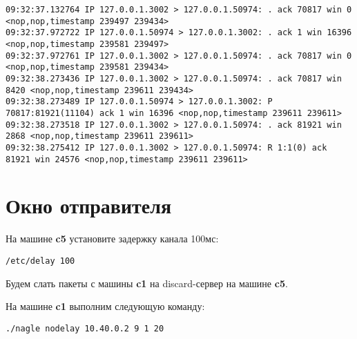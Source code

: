 \documentclass[a4paper,12pt]{article}
\begin{document}
\begin{Verbatim}
09:32:37.132764 IP 127.0.0.1.3002 > 127.0.0.1.50974: . ack 70817 win 0 <nop,nop,timestamp 239497 239434>
09:32:37.972722 IP 127.0.0.1.50974 > 127.0.0.1.3002: . ack 1 win 16396 <nop,nop,timestamp 239581 239497>
09:32:37.972761 IP 127.0.0.1.3002 > 127.0.0.1.50974: . ack 70817 win 0 <nop,nop,timestamp 239581 239434>
09:32:38.273436 IP 127.0.0.1.3002 > 127.0.0.1.50974: . ack 70817 win 8420 <nop,nop,timestamp 239611 239434>
09:32:38.273489 IP 127.0.0.1.50974 > 127.0.0.1.3002: P 70817:81921(11104) ack 1 win 16396 <nop,nop,timestamp 239611 239611>
09:32:38.273518 IP 127.0.0.1.3002 > 127.0.0.1.50974: . ack 81921 win 2868 <nop,nop,timestamp 239611 239611>
09:32:38.275412 IP 127.0.0.1.3002 > 127.0.0.1.50974: R 1:1(0) ack 81921 win 24576 <nop,nop,timestamp 239611 239611>
\end{Verbatim}

\section{Окно отправителя}

На машине \textbf{c5} установите задержку канала 100мс:
\begin{Verbatim}
/etc/delay 100
\end{Verbatim}

Будем слать пакеты с машины \textbf{c1} на discard-сервер на машине \textbf{c5}.

На машине \textbf{c1} выполним следующую команду:
\begin{Verbatim}
./nagle nodelay 10.40.0.2 9 1 20
\end{Verbatim}
\end{document}
